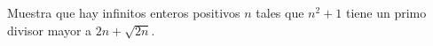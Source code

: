 Muestra que hay infinitos enteros positivos $n$ tales que $n^2+1$ tiene un primo divisor mayor a $ 2n + \sqrt {2n}$.
